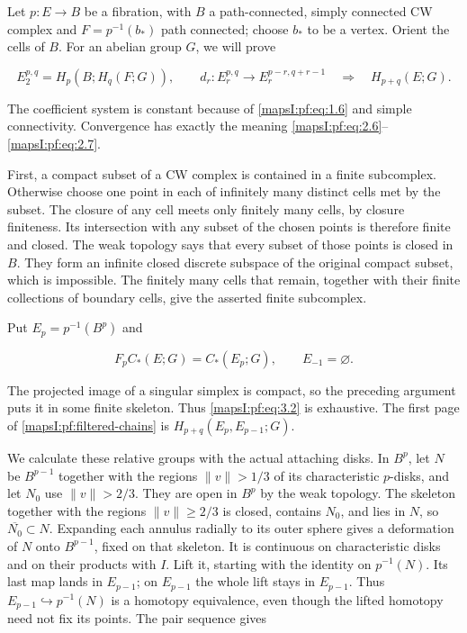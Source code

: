 Let \(p:E\to B\) be a fibration, with \(B\) a path-connected, simply connected CW complex and \(F=p^{-1}(b_*)\) path connected; choose \(b_*\) to be a vertex. Orient the cells of \(B\). For an abelian group \(G\), we will prove

\begin{equation}
E_2^{p,q}=H_p(B;H_q(F;G)),\qquad
d_r:E_r^{p,q}\longrightarrow E_r^{p-r,q+r-1}
\quad\Longrightarrow\quad H_{p+q}(E;G).
\label{mapsI:pf:eq:3.1}
\end{equation}

The coefficient system is constant because of \eqref{mapsI:pf:eq:1.6} and simple connectivity. Convergence has exactly the meaning \eqref{mapsI:pf:eq:2.6}--\eqref{mapsI:pf:eq:2.7}.

First, a compact subset of a CW complex is contained in a finite subcomplex. Otherwise choose one point in each of infinitely many distinct cells met by the subset. The closure of any cell meets only finitely many cells, by closure finiteness. Its intersection with any subset of the chosen points is therefore finite and closed. The weak topology says that every subset of those points is closed in \(B\). They form an infinite closed discrete subspace of the original compact subset, which is impossible. The finitely many cells that remain, together with their finite collections of boundary cells, give the asserted finite subcomplex.

Put \(E_p=p^{-1}(B^p)\) and

\begin{equation}
F_pC_*(E;G)=C_*(E_p;G),\qquad E_{-1}=\varnothing.
\label{mapsI:pf:eq:3.2}
\end{equation}

The projected image of a singular simplex is compact, so the preceding argument puts it in some finite skeleton. Thus \eqref{mapsI:pf:eq:3.2} is exhaustive. The first page of \cref{mapsI:pf:filtered-chains} is \(H_{p+q}(E_p,E_{p-1};G)\).

We calculate these relative groups with the actual attaching disks. In \(B^p\), let \(N\) be \(B^{p-1}\) together with the regions \(\|v\|>1/3\) of its characteristic \(p\)-disks, and let \(N_0\) use \(\|v\|>2/3\). They are open in \(B^p\) by the weak topology. The skeleton together with the regions \(\|v\|\geq2/3\) is closed, contains \(N_0\), and lies in \(N\), so \(\overline{N_0}\subset N\). Expanding each annulus radially to its outer sphere gives a deformation of \(N\) onto \(B^{p-1}\), fixed on that skeleton. It is continuous on characteristic disks and on their products with \(I\). Lift it, starting with the identity on \(p^{-1}(N)\). Its last map lands in \(E_{p-1}\); on \(E_{p-1}\) the whole lift stays in \(E_{p-1}\). Thus \(E_{p-1}\hookrightarrow p^{-1}(N)\) is a homotopy equivalence, even though the lifted homotopy need not fix its points. The pair sequence gives

